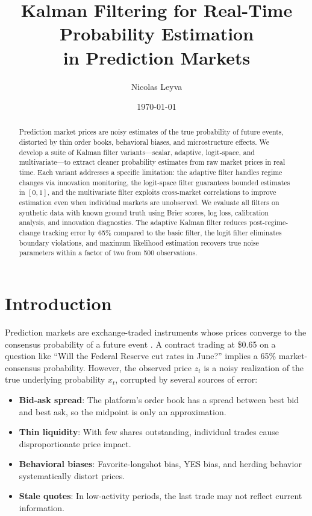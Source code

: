 \documentclass[11pt, a4paper]{article}
\title{Kalman Filtering for Real-Time Probability Estimation\\in Prediction Markets}
\author{Nicolas Leyva}
\date{\today}
\begin{document}
\maketitle

\begin{abstract}
Prediction market prices are noisy estimates of the true probability of future events, distorted by thin order books, behavioral biases, and microstructure effects. We develop a suite of Kalman filter variants---scalar, adaptive, logit-space, and multivariate---to extract cleaner probability estimates from raw market prices in real time. Each variant addresses a specific limitation: the adaptive filter handles regime changes via innovation monitoring, the logit-space filter guarantees bounded estimates in $[0,1]$, and the multivariate filter exploits cross-market correlations to improve estimation even when individual markets are unobserved. We evaluate all filters on synthetic data with known ground truth using Brier scores, log loss, calibration analysis, and innovation diagnostics. The adaptive Kalman filter reduces post-regime-change tracking error by 65\% compared to the basic filter, the logit filter eliminates boundary violations, and maximum likelihood estimation recovers true noise parameters within a factor of two from 500 observations.
\end{abstract}

\section{Introduction}

Prediction markets are exchange-traded instruments whose prices converge to the consensus probability of a future event \citep{polymarket2024}. A contract trading at \$0.65 on a question like ``Will the Federal Reserve cut rates in June?'' implies a 65\% market-consensus probability. However, the observed price $z_t$ is a noisy realization of the true underlying probability $x_t$, corrupted by several sources of error:

\begin{itemize}
    \item \textbf{Bid-ask spread}: The platform's order book has a spread between best bid and best ask, so the midpoint is only an approximation.
    \item \textbf{Thin liquidity}: With few shares outstanding, individual trades cause disproportionate price impact.
    \item \textbf{Behavioral biases}: Favorite-longshot bias, YES bias, and herding behavior systematically distort prices.
    \item \textbf{Stale quotes}: In low-activity periods, the last trade may not reflect current information.
\end{itemize}
\end{document}
